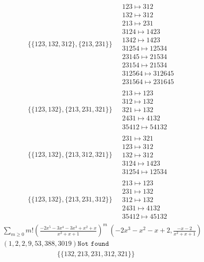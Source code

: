 \begin{scriptsize}
\begin{align}
\{\{123, 132, 312\}, \{213, 231\}\}
\ 
&
\begin{matrix}
123 \mapsto 312\\132 \mapsto 312\\213 \mapsto 231\\3124 \mapsto 1423\\1342 \mapsto 1423\\31254 \mapsto 12534\\23145 \mapsto 21534\\23154 \mapsto 21534\\312564 \mapsto 312645\\231564 \mapsto 231645
\end{matrix}
\\
\{\{123, 132\}, \{213, 231, 321\}\}
\ 
&
\begin{matrix}
213 \mapsto 123\\312 \mapsto 132\\321 \mapsto 132\\2431 \mapsto 4132\\35412 \mapsto 54132
\end{matrix}
\\
\{\{123, 132\}, \{213, 312, 321\}\}
\ 
&
\begin{matrix}
231 \mapsto 321\\123 \mapsto 312\\132 \mapsto 312\\3124 \mapsto 1423\\31254 \mapsto 12534
\end{matrix}
\\
\{\{123, 132\}, \{213, 231, 312\}\}
\ 
&
\begin{matrix}
213 \mapsto 123\\231 \mapsto 132\\312 \mapsto 132\\2431 \mapsto 4132\\35412 \mapsto 45132
\end{matrix}
\end{align}
$$
\begin{matrix}
\sum_{m \geq 0} m! \left(
\frac{-2 x^{5} - 3 x^{4} - 3 x^{3} + x^{2} + x}{x^{2} + x + 1}
\right)^m
\ 
\left(-2 x^{3} - x^{2} - x + 2, \frac{-x - 2}{x^{2} + x + 1}\right)
\\
\left(1, 2, 2, 9, 53, 388, 3019\right)
\texttt{Not found}
\end{matrix}
$$
\begin{align}
\{\{132, 213, 231, 312, 321\}\}
\ 
&
\begin{matrix}

\end{matrix}
\end{align}
\end{scriptsize}
